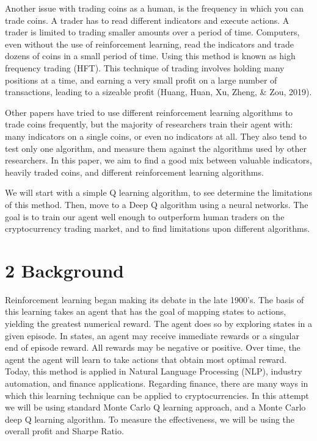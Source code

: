 \documentclass[letterpaper]{article}
\begin{document}
Another issue with trading coins as a human, is the frequency in which you can trade coins. A trader has to read different indicators and execute actions. A trader is limited to trading smaller amounts over a period of time. Computers, even without the use of reinforcement learning, read the indicators and trade dozens of coins in a small period of time. Using this method is known as high frequency trading (HFT). This technique of trading involves holding many positions at a time, and earning a very small profit on a large number of transactions, leading to a sizeable profit (Huang, Huan, Xu, Zheng, \& Zou, 2019).

Other papers have tried to use different reinforcement learning algorithms to trade coins frequently, but the majority of researchers train their agent with: many indicators on a single coins, or even no indicators at all. They also tend to test only one algorithm, and measure them against the algorithms used by other researchers. In this paper, we aim to find a good mix between valuable indicators, heavily traded coins, and different reinforcement learning algorithms. 

We will start with a simple Q learning algorithm, to see determine the limitations of this method. Then, move to a Deep Q algorithm using a neural networks. The goal is to train our agent well enough to outperform human traders on the cryptocurrency trading market, and to find limitations upon different algorithms.

\section{2 Background}
Reinforcement learning began making its debate in the late 1900's. The basis of this learning takes an agent that has the goal of mapping states to actions, yielding the greatest numerical reward. The agent does so by exploring states in a given episode. In states, an agent may receive immediate rewards or a singular end of episode reward. All rewards may be negative or positive. Over time, the agent the agent will learn to take actions that obtain most optimal reward. Today, this method is applied in Natural Language Processing (NLP), industry automation, and finance applications. Regarding finance, there are many ways in which this learning technique can be applied to cryptocurrencies. In this attempt we will be using standard Monte Carlo Q learning approach, and a Monte Carlo deep Q learning algorithm. To measure the effectiveness, we will be using the overall profit and Sharpe Ratio.
\end{document}
